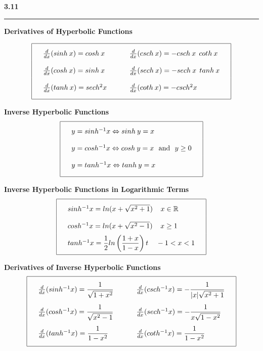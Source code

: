 \documentclass{article}
\begin{document}
\begin{center}
\Large\textbf{3.11}

\noindent\hfill\rule{0.3\textwidth}{.4pt}\hfill
\vspace{12pt}

\large\textbf{Derivatives of Hyperbolic Functions}
\begin{large}
\[\arraycolsep=16pt\def\arraystretch{2}
\begin{array}{| l l |}
	\hline
	\frac{d}{dx} (sinh\> x) = cosh\> x & \frac{d}{dx} (csch\> x) = -csch\> x \>\> coth\> x \\
	\frac{d}{dx} (cosh\> x) = sinh\> x & \frac{d}{dx} (sech\> x) = -sech\> x \>\> tanh\> x \\
	\frac{d}{dx} (tanh\> x) = sech^2 x & \frac{d}{dx} (coth\> x) = -csch^2 x \\
	[\medskipamount]	
	\hline
\end{array}
\]
\vspace{12pt}

\large\textbf{Inverse Hyperbolic Functions}
\[\arraycolsep=16pt\def\arraystretch{2}
\begin{array}{| l |}
	\hline
	y = sinh^{-1} x \Leftrightarrow sinh\> y = x \\
	y = cosh^{-1} x \Leftrightarrow cosh\> y = x \>\>\> \text{and} \>\>\> y \geq 0 \\
	y = tanh^{-1} x \Leftrightarrow tanh\> y = x \\
	[\medskipamount]	
	\hline
\end{array}
\]
\vspace{12pt}

\large\textbf{Inverse Hyperbolic Functions in Logarithmic Terms}
\[\arraycolsep=16pt\def\arraystretch{2}
\begin{array}{| l |}
	\hline
	sinh^{-1} x = ln(x+ \sqrt{x^2 + 1}) \>\>\>\>\> x \in \mathbb{R} \\
	cosh^{-1} x = ln(x + \sqrt{x^2 - 1}) \>\>\>\>\> x \geq 1 \\
	tanh^{-1} x = \dfrac{1}{2} ln \left( \dfrac{1+x}{1-x} \right)t \>\>\>\>\> -1 < x < 1 \\
	[\medskipamount]	
	\hline
\end{array}
\]
\vspace{12pt}

\large\textbf{Derivatives of Inverse Hyperbolic Functions}
\[\arraycolsep=16pt\def\arraystretch{2.5}
\begin{array}{| l l |}
	\hline
	\frac{d}{dx} (sinh^{-1} x) = \dfrac{1}{\sqrt{1 + x^2}} & \frac{d}{dx} (csch^{-1} x) = -\dfrac{1}{|x| \sqrt{x^2 + 1}} \\
	\frac{d}{dx} (cosh^{-1} x) = \dfrac{1}{\sqrt{x^2 - 1}} & \frac{d}{dx} (sech^{-1} x) = -\dfrac{1}{x \sqrt{1 - x^2}} \\
	\frac{d}{dx} (tanh^{-1} x) = \dfrac{1}{1 - x^2} & \frac{d}{dx} (coth^{-1} x) = \dfrac{1}{1 - x^2}\\
	[\medskipamount]	
	\hline
\end{array}
\]
\vspace{12pt}

\end{large}
\end{center}
\end{document}
